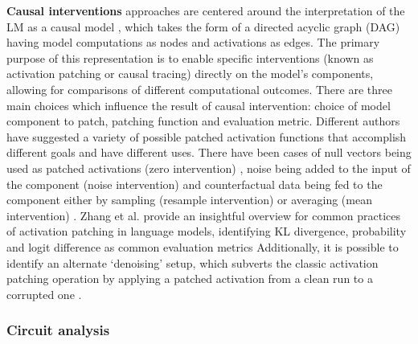 \textbf{Causal interventions} approaches are centered around the interpretation of the LM as a causal model \cite{geiger2021}, which takes the form of a directed acyclic graph (DAG) having model computations as nodes and activations as edges.
The primary purpose of this representation is to enable specific interventions (known as activation patching or causal tracing) directly on the model's components, allowing for comparisons of different computational outcomes.
There are three main choices which influence the result of causal intervention: choice of model component to patch, patching function and evaluation metric.
Different authors have suggested a variety of possible patched activation functions that accomplish different goals and have different uses.
There have been cases of null vectors being used as patched activations (zero intervention) \cite{olsson2022, mohebbi2023}, noise being added to the input of the component (noise intervention) \cite{meng2022} and counterfactual data being fed to the component either by sampling (resample intervention) \cite{hanna2023, conmy2023} or averaging (mean intervention) \cite{wang2022}.
Zhang et al. provide an insightful overview for common practices of activation patching in language models, identifying KL divergence, probability and logit difference as common evaluation metrics \cite{zhang2024}
Additionally, it is possible to identify an alternate `denoising' setup, which subverts the classic activation patching operation by applying a patched activation from a clean run to a corrupted one \cite{lieberum2023, meng2022}.


\subsubsection{Circuit analysis}

